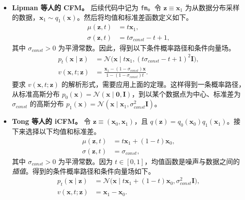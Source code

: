 \begin{itemize}
  \item \textbf{Lipman 等人的 CFM。} 后续代码中记为 \texttt{fm}。令 $\mathbf z\equiv\mathbf x_1$ 为从数据分布采样的数据，$\mathbf x_1\sim q_1(\mathbf x)$。然后将均值和标准差函数定义如下。
  \begin{align}
    \mu(\mathbf z,t)&=t\mathbf x_1,
      \tag{9.65}\label{eq:09-65}\\
    \sigma(\mathbf z,t)&=t\sigma_{\mathit{const}}-t+1,
      \tag{9.66}\label{eq:09-66}
  \end{align}
  其中 $\sigma_{\mathit{const}}>0$ 为平滑常数。因此，得到以下条件概率路径和条件向量场。
  \begin{align}
    p_t(\mathbf x\mid\mathbf z)
      &=\mathcal N\bigl(\mathbf x\mid t\mathbf x_1,(t\sigma_{\mathit{const}}-t+1)^2\mathbf I\bigr),
      \tag{9.67}\label{eq:09-67}\\
    v(\mathbf x,t;\mathbf z)
      &=\frac{\mathbf x_1-(1-\sigma_{\mathit{const}})\mathbf x}
        {1-(1-\sigma_{\mathit{const}})t}.
      \tag{9.68}\label{eq:09-68}
  \end{align}
  要求 $v(\mathbf x,t;\mathbf z)$ 的解析形式，需要应用上面的定理。这样得到一条概率路径，从标准高斯分布 $p_0(\mathbf x)=\mathcal N(\mathbf x\mid\mathbf 0,\mathbf I)$，到以某个数据点为中心、标准差为 $\sigma_{\mathit{const}}$ 的高斯分布 $p_1(\mathbf x)=\mathcal N(\mathbf x\mid\mathbf x_1,\sigma_{\mathit{const}}^2\mathbf I)$。
  \item \textbf{Tong 等人的 iCFM。} 令 $\mathbf z\equiv(\mathbf x_0,\mathbf x_1)$，且 $q(\mathbf z)=q_0(\mathbf x_0)q_1(\mathbf x_1)$。接下来选择以下均值和标准差。
  \begin{align}
    \mu(\mathbf z,t)&=t\mathbf x_1+(1-t)\mathbf x_0,
      \tag{9.69}\label{eq:09-69}\\
    \sigma(\mathbf z,t)&=\sigma_{\mathit{const}},
      \tag{9.70}\label{eq:09-70}
  \end{align}
  其中 $\sigma_{\mathit{const}}>0$ 为平滑常数。因为 $t\in[0,1]$，均值函数是噪声与数据之间的\emph{插值}。得到的条件概率路径和条件向量场如下。
  \begin{align}
    p_t(\mathbf x\mid\mathbf z)
      &=\mathcal N\bigl(\mathbf x\mid t\mathbf x_1+(1-t)\mathbf x_0,
        \sigma_{\mathit{const}}^2\mathbf I\bigr),
      \tag{9.71}\label{eq:09-71}\\
    v(\mathbf x,t;\mathbf z)&=\mathbf x_1-\mathbf x_0.
      \tag{9.72}\label{eq:09-72}
  \end{align}

\end{itemize}
